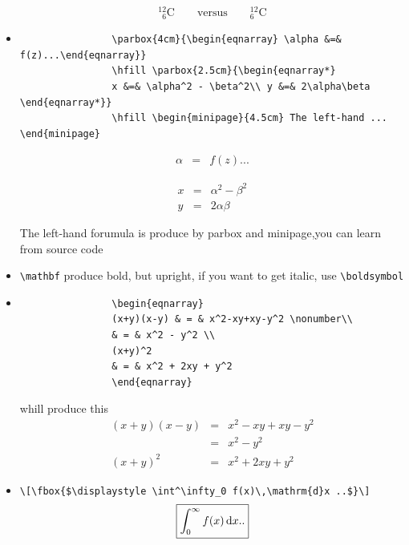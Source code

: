 \documentclass[a4paper,12pt,twoside]{book}
\begin{document}
\begin{CJK*}{UTF8}{song}
\begin{itemize}
				\begin{displaymath}
				{}^{12}_{\phantom{1}6}\textrm{C} \qquad \textrm{versus}
				\qquad {}^{12}_6\textrm{C}
				\end{displaymath}
			\item
				\begin{verbatim}
				\parbox{4cm}{\begin{eqnarray} \alpha &=& f(z)...\end{eqnarray}}
				\hfill \parbox{2.5cm}{\begin{eqnarray*}
				x &=& \alpha^2 - \beta^2\\ y &=& 2\alpha\beta \end{eqnarray*}}
				\hfill \begin{minipage}{4.5cm} The left-hand ... \end{minipage}
				\end{verbatim}
				
				\parbox{4cm}{\begin{eqnarray} \alpha &=& f(z)...\end{eqnarray}}
				\hfill \parbox{2.5cm}{\begin{eqnarray*}
				x &=& \alpha^2 - \beta^2\\ y &=& 2\alpha\beta \end{eqnarray*}}
				\hfill \begin{minipage}{4.5cm} The left-hand forumula is produce by parbox and minipage,you can learn from source code \end{minipage}
			\item
			\verb=\mathbf= produce bold, but upright, if you want to get italic, use \verb=\boldsymbol=
			\item
			\begin{verbatim}
				\begin{eqnarray}
				(x+y)(x-y) & = & x^2-xy+xy-y^2 \nonumber\\
				& = & x^2 - y^2 \\
				(x+y)^2
				& = & x^2 + 2xy + y^2
				\end{eqnarray}
			\end{verbatim}
			whill produce this
			\begin{eqnarray}
			(x+y)(x-y) & = & x^2-xy+xy-y^2 \nonumber\\
			& = & x^2 - y^2 \\
			(x+y)^2
			& = & x^2 + 2xy + y^2
			\end{eqnarray}

			\item \verb=\[\fbox{$\displaystyle \int^\infty_0 f(x)\,\mathrm{d}x ..$}\]=
				\[\fbox{$\displaystyle \int^\infty_0 f(x)\,\mathrm{d}x ..$}\]
			

\end{itemize}
\end{CJK*}
\end{document}
